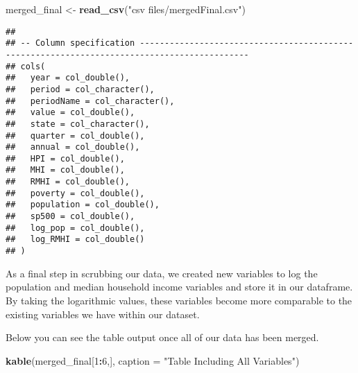 \documentclass[
]{article}
\newenvironment{Shaded}{\begin{snugshade}}{\end{snugshade}}
\newcommand{\CommentTok}[1]{\textcolor[rgb]{0.56,0.35,0.01}{\textit{#1}}}
\newcommand{\DataTypeTok}[1]{\textcolor[rgb]{0.13,0.29,0.53}{#1}}
\newcommand{\DecValTok}[1]{\textcolor[rgb]{0.00,0.00,0.81}{#1}}
\newcommand{\KeywordTok}[1]{\textcolor[rgb]{0.13,0.29,0.53}{\textbf{#1}}}
\newcommand{\NormalTok}[1]{#1}
\newcommand{\OperatorTok}[1]{\textcolor[rgb]{0.81,0.36,0.00}{\textbf{#1}}}
\newcommand{\StringTok}[1]{\textcolor[rgb]{0.31,0.60,0.02}{#1}}
\begin{document}
\begin{Shaded}
\begin{Highlighting}[]
\NormalTok{merged_final <-}\StringTok{ }\KeywordTok{read_csv}\NormalTok{(}\StringTok{"csv files/mergedFinal.csv"}\NormalTok{)}
\end{Highlighting}
\end{Shaded}

\begin{verbatim}
## 
## -- Column specification --------------------------------------------------------------------------------------------
## cols(
##   year = col_double(),
##   period = col_character(),
##   periodName = col_character(),
##   value = col_double(),
##   state = col_character(),
##   quarter = col_double(),
##   annual = col_double(),
##   HPI = col_double(),
##   MHI = col_double(),
##   RMHI = col_double(),
##   poverty = col_double(),
##   population = col_double(),
##   sp500 = col_double(),
##   log_pop = col_double(),
##   log_RMHI = col_double()
## )
\end{verbatim}

\begin{Shaded}
\end{Shaded}

As a final step in scrubbing our data, we created new variables to log
the population and median household income variables and store it in our
dataframe. By taking the logarithmic values, these variables become more
comparable to the existing variables we have within our dataset.

Below you can see the table output once all of our data has been merged.

\begin{Shaded}
\begin{Highlighting}[]
\KeywordTok{kable}\NormalTok{(merged_final[}\DecValTok{1}\OperatorTok{:}\DecValTok{6}\NormalTok{,], }\DataTypeTok{caption =} \StringTok{"Table Including All Variables"}\NormalTok{)}
\end{Highlighting}
\end{Shaded}
\end{document}
